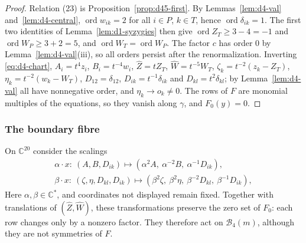 \documentclass[11pt]{amsart}
\theoremstyle{definition}
\theoremstyle{remark}
\newcommand{\C}{\mathbb{C}}
\newcommand{\ord}{\operatorname{ord}}
\begin{document}
\begin{proof}
Relation (23) is Proposition~\ref{prop:d45-first}.  By Lemmas~\ref{lem:d4-val}
and~\ref{lem:d4-central}, $\ord w_{ik}=2$ for all $i\in P$, $k\in T$, hence $\ord\delta_{ik}=1$.
The first two identities of Lemma~\ref{lem:d1-syzygies} then give $\ord Z_T\ge3-4=-1$ and
$\ord W_P\ge3+2=5$, and $\ord W_T=\ord W_P$.  The factor $c$ has order $0$ by
Lemma~\ref{lem:d4-val}(iii), so all orders persist after the renormalization.  Inverting
\eqref{eq:d4-chart}, $A_i=t^4z_i$, $B_i=t^{-4}w_i$, $\hat Z=tZ_T$, $\hat W=t^{-5}W_T$,
$\zeta_k=t^{-2}(z_k-Z_T)$, $\eta_k=t^{-2}(w_k-W_T)$, $D_{12}=\delta_{12}$, $D_{ik}=t^{-1}\delta_{ik}$
and $D_{kl}=t^2\delta_{kl}$; by Lemma~\ref{lem:d4-val} all have nonnegative order, and
$\eta_k\to o_k\ne0$.  The rows of $F$ are monomial multiples of the equations, so they vanish
along $\gamma$, and $F_0(y)=0$.
\end{proof}

\subsubsection{The boundary fibre}\label{d4-fibre}
On $\C^{20}$ consider the scalings
\[
\begin{gathered}
  \alpha\cdot x:\ (A,B,D_{ik})\mapsto(\alpha^2A,\ \alpha^{-2}B,\ \alpha^{-1}D_{ik}),\\
  \beta\cdot x:\ (\zeta,\eta,D_{kl},D_{ik})\mapsto(\beta^2\zeta,\ \beta^2\eta,\ \beta^{-2}D_{kl},\
  \beta^{-1}D_{ik}),
\end{gathered}
\]
{Here $\alpha,\beta\in\C^*$, and coordinates not displayed remain fixed.
Together with translations of $(\hat Z,\hat W)$, these transformations preserve the zero set
of $F_0$: each row changes only by a nonzero factor.
They therefore act on $\mathcal B_4(m)$, although they are not symmetries of $F$.}
\end{document}
